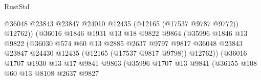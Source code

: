 \begin{lexlean}{RustStd}
\begin{coremodule}
                                            @36048
                                            @23843
                                            @23847
                                            @24010
                                            @12435
                                            (@12165 (@17537 @9787 @9772))
                                            @12762))
                                        (@36016
                                          @1846
                                          @1931
                                          @13
                                          @18
                                          @9822
                                          @9864
                                          (@35996
                                            @1846
                                            @13
                                            @9822
                                            (@36030
                                              @574
                                              @60
                                              @13
                                              @2885
                                              @2637
                                              @9797
                                              @9817
                                              @36048
                                              @23843
                                              @23847
                                              @24430
                                              @12435
                                              (@12165 (@17537 @9817 @9798))
                                              @12762))
                                          (@36016
                                            @1707
                                            @1930
                                            @13
                                            @17
                                            @9841
                                            @9863
                                            (@35996
                                              @1707
                                              @13
                                              @9841
                                              (@36155
                                                @108
                                                @60
                                                @13
                                                @8108
                                                @2637
                                                @9827

\end{coremodule}
\end{lexlean}
